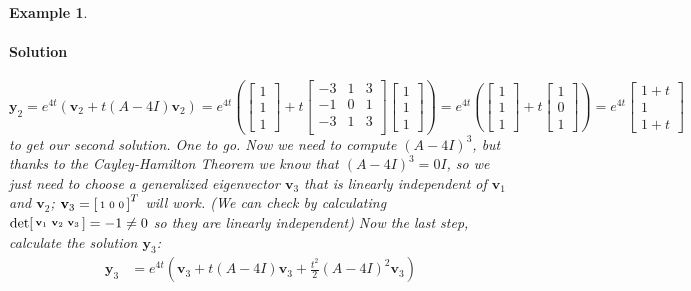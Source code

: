 \documentclass[letterpaper, 11pt, openany]{book}
\theoremstyle{mytheoremstyle}
\theoremstyle{myexamplestyle}
\newtheorem{example}{Example}[section]
\newenvironment{solution}{\paragraph{\sffamily \smaller \fontseries{b}\selectfont Solution}}{\hfill\faSquare}
\begin{document}
\begin{example}
\begin{enumerate}
\begin{solution}
            \[\mathbf{y}_2 = e^{4t} \left(\mathbf{v}_2 + t(A-4I)\mathbf{v}_2\right) = e^{4t}\left(\begin{bmatrix}1 \\ 1 \\ 1\end{bmatrix} + t \left[
                \begin{array}{ccc}
                 -3 & 1 & 3 \\
                 -1 & 0 & 1 \\
                 -3 & 1 & 3 \\
                \end{array}
                \right]\begin{bmatrix}1 \\ 1 \\ 1\end{bmatrix}
                \right) = 
                e^{4t}\left(\begin{bmatrix}1 \\ 1 \\ 1\end{bmatrix} + t \begin{bmatrix}1 \\ 0 \\ 1\end{bmatrix}\right) = e^{4t} \begin{bmatrix}1 + t \\ 1 \\ 1+ t\end{bmatrix}\]
                to get our second solution. One to go. Now we need to compute \((A - 4I)^3\), but thanks to the Cayley-Hamilton Theorem we know that \((A - 4I)^3 = 0I\), so we just need to choose a generalized eigenvector \(\mathbf{v}_3\) that is linearly independent of \(\mathbf{v}_1\) and \(\mathbf{v}_2\); \(\mathbf{v}_3 = \begin{bsmallmatrix}1 & 0 & 0\end{bsmallmatrix}^{T}\) will work. (We can check by calculating \(\det  \begin{bsmallmatrix}\mathbf{v}_1 & \mathbf{v}_2 &\mathbf{v}_3 \end{bsmallmatrix} = -1 \neq 0\) so they are linearly independent)
                Now the last step, calculate the solution \(\mathbf{y}_3\):
                \begin{align*}
                    \mathbf{y}_3    &= e^{4t}\left(\mathbf{v}_3 + t(A-4I)\mathbf{v}_3 + \frac{t^2}{2}(A-4I)^{2}\mathbf{v}_3\right)\\

\end{align*}
\end{solution}
\end{enumerate}
\end{example}
\end{document}
